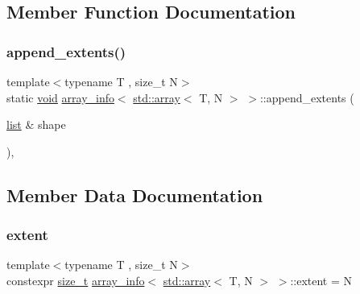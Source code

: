 \subsection{Member Function Documentation}
\mbox{\label{structarray__info_3_01std_1_1array_3_01_t_00_01_n_01_4_01_4_ac08c22b2e5c8f93e9f4c971a9f71db16}} 
\subsubsection{\texorpdfstring{append\_extents()}{append\_extents()}}
{\footnotesize\ttfamily template$<$typename T , size\+\_\+t N$>$ \\
static \mbox{\hyperlink{_s_d_l__opengles2__gl2ext_8h_ae5d8fa23ad07c48bb609509eae494c95}{void}} \mbox{\hyperlink{structarray__info}{array\+\_\+info}}$<$ \mbox{\hyperlink{_s_d_l__opengl__glext_8h_a52f38e7d822a46377fde7a02708eedb1}{std\+::array}}$<$ T, N $>$ $>$\+::append\+\_\+extents (\begin{DoxyParamCaption}\item[{\mbox{\hyperlink{classlist}{list}} \&}]{shape }\end{DoxyParamCaption})\hspace{0.3cm}{\ttfamily [inline]}, {\ttfamily [static]}}



\subsection{Member Data Documentation}
\mbox{\label{structarray__info_3_01std_1_1array_3_01_t_00_01_n_01_4_01_4_ab89fea43d0533912fd3495c3fbe0a303}} 
\subsubsection{\texorpdfstring{extent}{extent}}
{\footnotesize\ttfamily template$<$typename T , size\+\_\+t N$>$ \\
constexpr \mbox{\hyperlink{detail_2common_8h_a801d6a451a01953ef8cbae6feb6a3638}{size\+\_\+t}} \mbox{\hyperlink{structarray__info}{array\+\_\+info}}$<$ \mbox{\hyperlink{_s_d_l__opengl__glext_8h_a52f38e7d822a46377fde7a02708eedb1}{std\+::array}}$<$ T, N $>$ $>$\+::extent = N\hspace{0.3cm}{\ttfamily [static]}}

